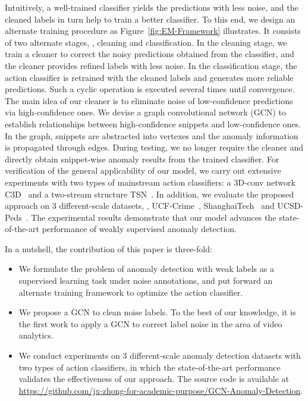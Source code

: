 \documentclass[10pt,twocolumn,letterpaper]{article}
\begin{document}
Intuitively, a well-trained classifier yields the predictions with less noise, and the cleaned labels in turn help to train a better classifier. To this end, we design an alternate training procedure as Figure~\ref{fig:EM-Framework} illustrates. It consists of two alternate stages, \ie, cleaning and classification. In the cleaning stage, we train a cleaner to correct the noisy predictions obtained from the classifier, and the cleaner provides refined labels with less noise. In the classification stage, the action classifier is retrained with the cleaned labels and generates more reliable predictions. Such a cyclic operation is executed several times until convergence. The main idea of our cleaner is to eliminate noise of low-confidence predictions via high-confidence ones. We devise a graph convolutional network (GCN) to establish relationships between high-confidence snippets and low-confidence ones. In the graph, snippets are abstracted into vertexes and the anomaly information is propagated through edges. During testing, we no longer require the cleaner and directly obtain snippet-wise anomaly results from the trained classifier. For verification of the general applicability of our model, we carry out extensive experiments with two types of mainstream action classifiers: a 3D-conv network C3D~\cite{tran2015learning} and a two-stream structure TSN~\cite{tsn_wang}. In addition, we evaluate the proposed approach on 3 different-scale datasets, \ie, {UCF-Crime}~\cite{Sultani_2018_CVPR}, {ShanghaiTech}~\cite{Luo_2017_ICCV} and {UCSD-Peds}~\cite{li2014crowded}. The experimental results demonstrate that our model advances the state-of-the-art performance of weakly supervised anomaly detection. 

In a nutshell, the contribution of this paper is three-fold:
\begin{itemize}
  \item We formulate the problem of anomaly detection with weak labels as a supervised learning task under noise annotations, and put forward an alternate training framework to optimize the action classifier.
  \item	We propose a GCN to clean noise labels. To the best of our knowledge, it is the first work to apply a GCN to correct label noise in the area of video analytics.
  \item	We conduct experiments on 3 different-scale anomaly detection datasets with two types of action classifiers, in which the state-of-the-art performance validates the effectiveness of our approach. The source code is available at {\color{blue}\href{https://github.com/jx-zhong-for-academic-purpose/GCN-Anomaly-Detection}{https://github.com/jx-zhong-for-academic-purpose/GCN-Anomaly-Detection}}.
\end{itemize}
\end{document}
